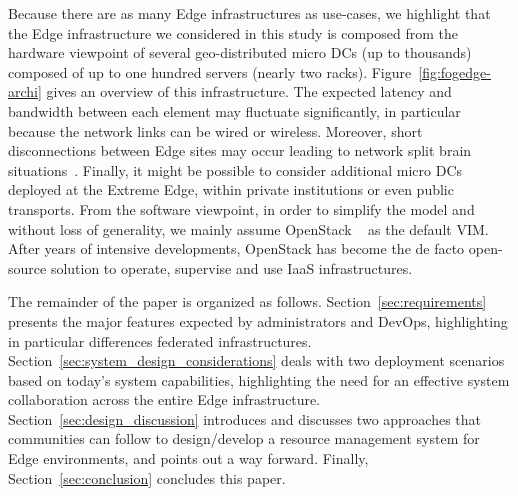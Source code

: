 Because there are as many Edge infrastructures as use-cases, we
highlight that the Edge infrastructure we considered in this
study is composed from the hardware viewpoint of several
geo-distributed micro DCs (up to thousands)
composed of up to one hundred servers (nearly two racks).
Figure~\ref{fig:fogedge-archi} gives an overview of this
infrastructure. The expected latency and bandwidth between
each element may fluctuate significantly, in particular because the
network links can be wired or wireless. Moreover, short disconnections
between Edge sites may occur leading to network split brain
situations~\cite{4456903}. Finally, it might be possible
to consider additional micro DCs deployed at the Extreme Edge, within
private institutions or even public transports.
%
From the software viewpoint, in order to simplify the model and
without loss of generality, we mainly assume OpenStack ~\cite{openstack:www} as the default VIM.  After years of intensive developments, OpenStack has
become the de facto open-source solution to operate, supervise and use
IaaS infrastructures.

The remainder of the paper is organized as
follows. Section~\ref{sec:requirements} presents the major features
expected by administrators and DevOps, highlighting in particular
differences \wrt federated infrastructures.
Section~\ref{sec:system_design_considerations} deals with two
deployment scenarios based on today's system capabilities,
highlighting the need for an effective system collaboration across the
entire Edge infrastructure. Section~\ref{sec:design_discussion}
introduces and discusses two approaches that communities can follow to
design/develop a resource management system for Edge
environments, and points out a way forward. Finally,
Section~\ref{sec:conclusion} concludes this paper.


